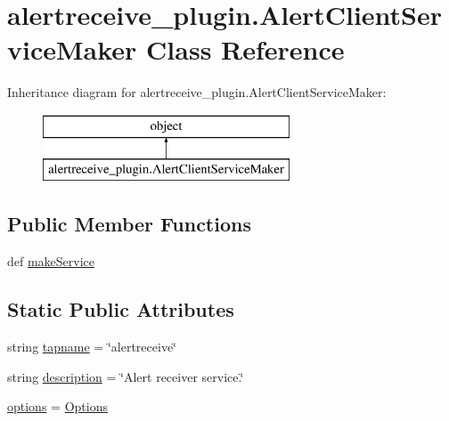 \hypertarget{classalertreceive__plugin_1_1_alert_client_service_maker}{\section{alertreceive\-\_\-plugin.\-Alert\-Client\-Service\-Maker Class Reference}
\label{classalertreceive__plugin_1_1_alert_client_service_maker}
}
Inheritance diagram for alertreceive\-\_\-plugin.\-Alert\-Client\-Service\-Maker\-:\begin{figure}[H]
\begin{center}
\leavevmode
\includegraphics[height=2.000000cm]{d5/dbd/classalertreceive__plugin_1_1_alert_client_service_maker}
\end{center}
\end{figure}
\subsection*{Public Member Functions}
\begin{DoxyCompactItemize}
\item 
def \hyperlink{classalertreceive__plugin_1_1_alert_client_service_maker_ac557b7942ac384b03f36f130cd832224}{make\-Service}
\end{DoxyCompactItemize}
\subsection*{Static Public Attributes}
\begin{DoxyCompactItemize}
\item 
string \hyperlink{classalertreceive__plugin_1_1_alert_client_service_maker_aa06203843a8e49cf4a4e3ce3bb0e9674}{tapname} = \char`\"{}alertreceive\char`\"{}
\item 
string \hyperlink{classalertreceive__plugin_1_1_alert_client_service_maker_a1e9e4e09410f1652b9e3e64713a9ed23}{description} = \char`\"{}Alert receiver service.\char`\"{}
\item 
\hyperlink{classalertreceive__plugin_1_1_alert_client_service_maker_a602e325f18585e9ee7d01055df4c4977}{options} = \hyperlink{classalertreceive__plugin_1_1_options}{Options}
\end{DoxyCompactItemize}


